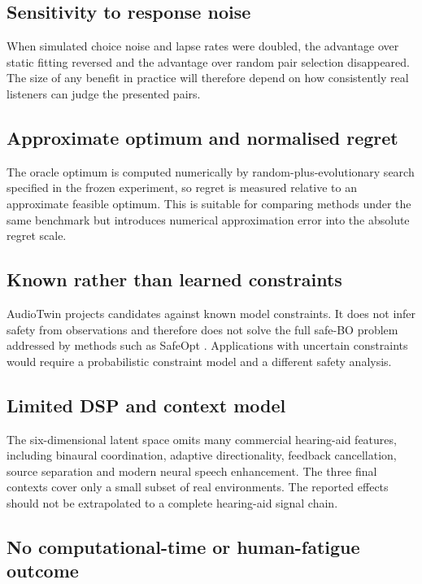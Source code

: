 \documentclass[preprint,12pt]{elsarticle}
\begin{document}
\subsection{Sensitivity to response noise}

When simulated choice noise and lapse rates were doubled, the advantage over static fitting reversed and the advantage over random pair selection disappeared. The size of any benefit in practice will therefore depend on how consistently real listeners can judge the presented pairs.

\subsection{Approximate optimum and normalised regret}

The oracle optimum is computed numerically by random-plus-evolutionary search specified in the frozen experiment, so regret is measured relative to an approximate feasible optimum. This is suitable for comparing methods under the same benchmark but introduces numerical approximation error into the absolute regret scale.

\subsection{Known rather than learned constraints}

AudioTwin projects candidates against known model constraints. It does not infer safety from observations and therefore does not solve the full safe-BO problem addressed by methods such as SafeOpt \cite{sui2015}. Applications with uncertain constraints would require a probabilistic constraint model and a different safety analysis.

\subsection{Limited DSP and context model}

The six-dimensional latent space omits many commercial hearing-aid features, including binaural coordination, adaptive directionality, feedback cancellation, source separation and modern neural speech enhancement. The three final contexts cover only a small subset of real environments. The reported effects should not be extrapolated to a complete hearing-aid signal chain.

\subsection{No computational-time or human-fatigue outcome}
\end{document}
